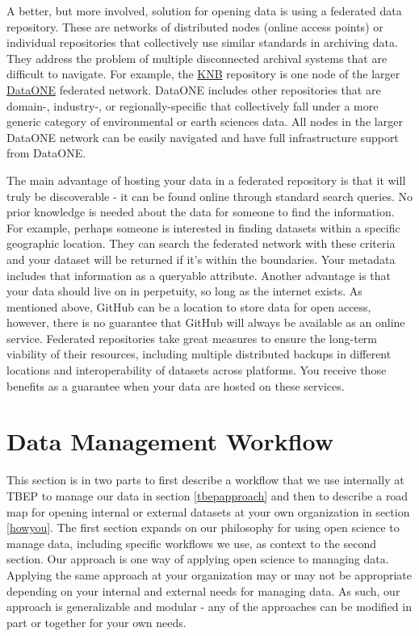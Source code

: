 \documentclass[
]{book}
\begin{document}
A better, but more involved, solution for opening data is using a federated data repository. These are networks of distributed nodes (online access points) or individual repositories that collectively use similar standards in archiving data. They address the problem of multiple disconnected archival systems that are difficult to navigate. For example, the \href{https://knb.ecoinformatics.org/}{KNB} repository is one node of the larger \href{https://www.dataone.org/}{DataONE} federated network. DataONE includes other repositories that are domain-, industry-, or regionally-specific that collectively fall under a more generic category of environmental or earth sciences data. All nodes in the larger DataONE network can be easily navigated and have full infrastructure support from DataONE.

The main advantage of hosting your data in a federated repository is that it will truly be discoverable - it can be found online through standard search queries. No prior knowledge is needed about the data for someone to find the information. For example, perhaps someone is interested in finding datasets within a specific geographic location. They can search the federated network with these criteria and your dataset will be returned if it's within the boundaries. Your metadata includes that information as a queryable attribute. Another advantage is that your data should live on in perpetuity, so long as the internet exists. As mentioned above, GitHub can be a location to store data for open access, however, there is no guarantee that GitHub will always be available as an online service. Federated repositories take great measures to ensure the long-term viability of their resources, including multiple distributed backups in different locations and interoperability of datasets across platforms. You receive those benefits as a guarantee when your data are hosted on these services.

\hypertarget{workflow}{%
\chapter{Data Management Workflow}\label{workflow}}

This section is in two parts to first describe a workflow that we use internally at TBEP to manage our data in section \ref{tbepapproach} and then to describe a road map for opening internal or external datasets at your own organization in section \ref{howyou}. The first section expands on our philosophy for using open science to manage data, including specific workflows we use, as context to the second section. Our approach is one way of applying open science to managing data. Applying the same approach at your organization may or may not be appropriate depending on your internal and external needs for managing data. As such, our approach is generalizable and modular - any of the approaches can be modified in part or together for your own needs.
\end{document}
